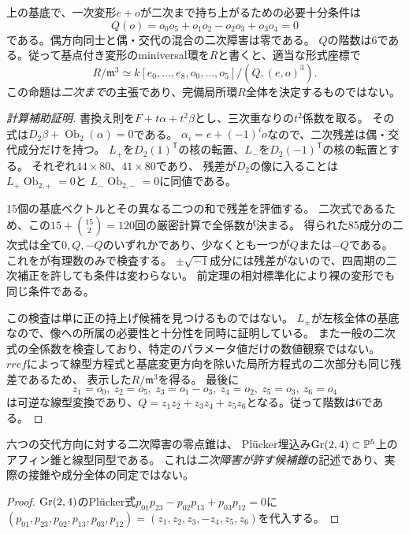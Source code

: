 \begin{theorem}[全15方向の二次障害]\label{thm:clifford-quadratic}
上の基底で、一次変形$e+o$が二次まで持ち上がるための必要十分条件は
\begin{equation}\label{eq:clifford-Q}
 Q(o)=o_0o_5+o_1o_2-o_2o_3+o_3o_4=0
\end{equation}
である。偶方向同士と偶・交代の混合の二次障害は零である。
$Q$の階数は6である。従って基点付き変形のminiversal環を$R$と書くと、適当な形式座標で
\[
 R/\mathfrak m^3\simeq
 k[e_0,\ldots,e_8,o_0,\ldots,o_5]/(Q,(e,o)^3).
\]
この命題は\emph{二次まで}の主張であり、完備局所環$R$全体を決定するものではない。
\end{theorem}
\begin{proof}[計算補助証明]
書換え則を$F+t\alpha+t^2\beta$とし、三次重なりの$t^2$係数を取る。
その式は$D_2\beta+\operatorname{Ob}_2(\alpha)=0$である。
$\alpha_i=e+(-1)^i o$なので、二次残差は偶・交代成分だけを持つ。
$L_+$を$D_2(1)^{\mathsf T}$の核の転置、$L_-$を$D_2(-1)^{\mathsf T}$の核の転置とする。
それぞれ$44\times80$、$41\times80$であり、
残差が$D_2$の像に入ることは$L_+\operatorname{Ob}_{2,+}=0$と
$L_-\operatorname{Ob}_{2,-}=0$に同値である。

15個の基底ベクトルとその異なる二つの和で残差を評価する。
二次式であるため、この$15+\binom{15}{2}=120$回の厳密計算で全係数が決まる。
得られた85成分の二次式は全て$0,Q,-Q$のいずれかであり、少なくとも一つが$Q$または$-Q$である。
これをが有理数のみで検査する。
$\pm\sqrt{-1}$成分には残差がないので、四周期の二次補正を許しても条件は変わらない。
前定理の相対標準化により裸の変形でも同じ条件である。

この検査は単に正の持上げ候補を見つけるものではない。
$L_\pm$が左核全体の基底なので、像への所属の必要性と十分性を同時に証明している。
また一般の二次式の全係数を検査しており、特定のパラメータ値だけの数値観察ではない。
$rref$によって線型方程式と基底変更方向を除いた局所方程式の二次部分も同じ残差であるため、
表示した$R/\mathfrak m^3$を得る。
最後に
\[
 z_1=o_0,\ z_2=o_5,\ z_3=o_1-o_3,\ z_4=o_2,\ z_5=o_3,\ z_6=o_4
\]
は可逆な線型変換であり、$Q=z_1z_2+z_3z_4+z_5z_6$となる。従って階数は6である。
\end{proof}

\begin{corollary}[Pl\"ucker型の最初の障害]\label{cor:plucker-obstruction}
六つの交代方向に対する二次障害の零点錐は、
Pl\"ucker埋込み$\operatorname{Gr}(2,4)\subset\mathbb P^5$上のアフィン錐と線型同型である。
これは\emph{二次障害が許す候補錐}の記述であり、実際の接錐や成分全体の同定ではない。
\end{corollary}
\begin{proof}
$\operatorname{Gr}(2,4)$のPl\"ucker式$p_{01}p_{23}-p_{02}p_{13}+p_{03}p_{12}=0$に
$(p_{01},p_{23},p_{02},p_{13},p_{03},p_{12})=(z_1,z_2,z_3,-z_4,z_5,z_6)$を代入する。
\end{proof}

